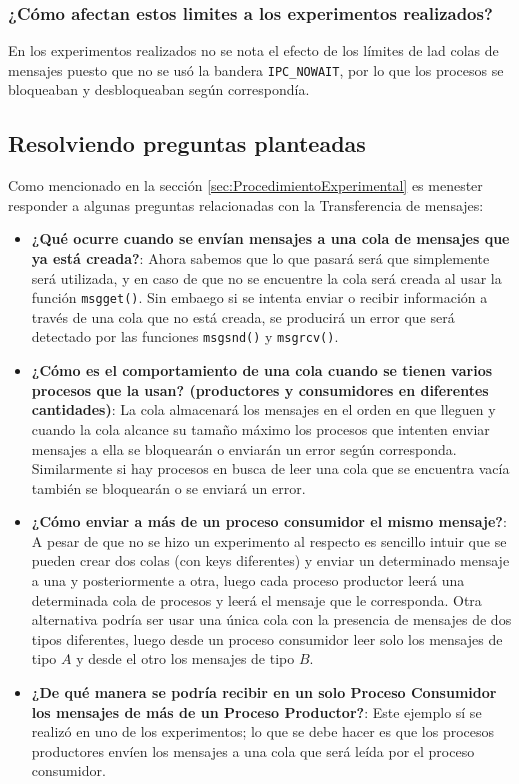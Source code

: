 \subsubsection*{¿Cómo afectan estos limites a los experimentos realizados?}
En los experimentos realizados no se nota el efecto de los límites de lad colas de mensajes puesto que no se usó la bandera \texttt{IPC\_NOWAIT}, por lo que los procesos se bloqueaban y desbloqueaban según correspondía.

\subsection{Resolviendo preguntas planteadas}
Como mencionado en la sección \ref{sec:ProcedimientoExperimental} es menester responder a algunas preguntas relacionadas con la Transferencia de mensajes:
\begin{itemize}
    \item \textbf{¿Qué ocurre cuando se envían mensajes a una cola de mensajes que ya está creada?}: Ahora sabemos que lo que pasará será que simplemente será utilizada, y en caso de que no se encuentre la cola será creada al usar la función \texttt{msgget()}. Sin embaego si se intenta enviar o recibir información a través de una cola que no está creada, se producirá un error que será detectado por las funciones \texttt{msgsnd()} y \texttt{msgrcv()}.
    \item \textbf{¿Cómo es el comportamiento de una cola cuando se tienen varios procesos que la usan? (productores y consumidores en diferentes cantidades)}: La cola almacenará los mensajes en el orden en que lleguen y cuando la cola alcance su tamaño máximo los procesos que intenten enviar mensajes a ella se bloquearán o enviarán un error según corresponda. Similarmente si hay procesos en busca de leer una cola que se encuentra vacía también se bloquearán o se enviará un error.
    \item \textbf{¿Cómo enviar a más de un proceso consumidor el mismo mensaje?}: A pesar de que no se hizo un experimento al respecto es sencillo intuir que se pueden crear dos colas (con keys diferentes) y enviar un determinado mensaje a una y posteriormente a otra, luego cada proceso productor leerá una determinada cola de procesos y leerá el mensaje que le corresponda.
    Otra alternativa podría ser usar una única cola con la presencia de mensajes de dos tipos diferentes, luego desde un proceso consumidor leer solo los mensajes de tipo $A$ y desde el otro los mensajes de tipo $B$.
    \item \textbf{¿De qué manera se podría recibir en un solo Proceso Consumidor los mensajes de más de un Proceso Productor?}: Este ejemplo sí se realizó en uno de los experimentos; lo que se debe hacer es que los procesos productores envíen los mensajes a una cola que será leída por el proceso consumidor.
\end{itemize}


